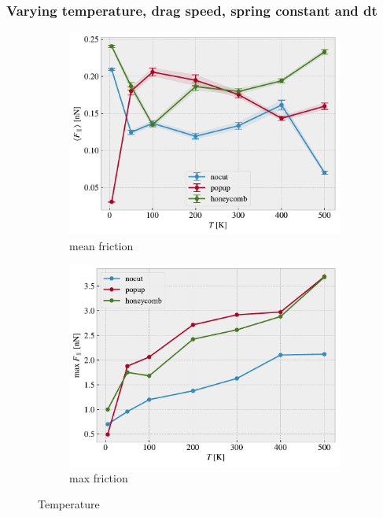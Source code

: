 \newpage
\subsubsection{Varying temperature, drag speed, spring constant and dt}


\begin{figure}[H]
  \centering
  \begin{subfigure}[b]{0.49\textwidth}
      \centering
      \includegraphics[width=\textwidth]{figures/baseline/variables_temp_mean_K30.pdf}
      \caption{mean friction}
      \label{fig:var_temp_mean}
  \end{subfigure}
  \hfill
  \begin{subfigure}[b]{0.49\textwidth}
      \centering
      \includegraphics[width=\textwidth]{figures/baseline/variables_temp_max_K30.pdf}
      \caption{max friction}
      \label{fig:var_temp_max}
  \end{subfigure}
  \hfill
     \caption{Temperature}
     \label{fig:var_temp}
\end{figure}


